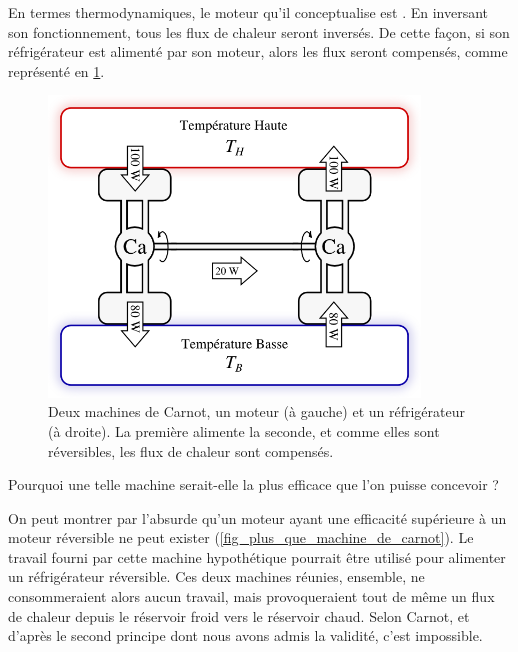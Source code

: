 		En termes thermodynamiques, le moteur qu’il conceptualise est . En inversant son fonctionnement, tous les flux de chaleur seront inversés. De cette façon, si son réfrigérateur est alimenté par son moteur, alors les flux seront compensés, comme représenté en \cref{fig_deux_machines_de_carnot}.

		\begin{figure}
			\begin{center}
				\includegraphics[height=8cm]{images/carnot_moteur_refrigerateur.png}
			\end{center}
			\caption{Deux machines de Carnot, un moteur (à gauche) et un réfrigérateur (à droite).
			La première alimente la seconde, et comme elles sont réversibles, les flux de chaleur sont compensés.}
			\label{fig_deux_machines_de_carnot}
		\end{figure}

		Pourquoi une telle machine serait-elle la plus efficace que l’on puisse concevoir ?

		On peut montrer par l’absurde qu’un moteur ayant une efficacité supérieure à un moteur réversible ne peut exister (\cref{fig_plus_que_machine_de_carnot}). Le travail fourni par cette machine hypothétique pourrait être utilisé pour alimenter un réfrigérateur réversible. Ces deux machines réunies, ensemble, ne consommeraient alors aucun travail, mais provoqueraient tout de même un flux de chaleur depuis le réservoir froid vers le réservoir chaud. Selon Carnot, et d’après le second principe dont nous avons admis la validité, c’est impossible.

